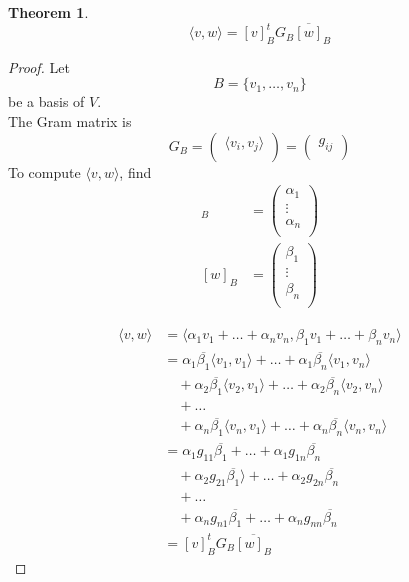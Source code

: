 \documentclass[fleqn, a4paper, 12pt]{article}
\theoremstyle{definition}
\theoremstyle{theorem}
\newtheorem{theorem}{Theorem} %
\theoremstyle{remark}
\numberwithin{corollary}{theorem}
\numberwithin{equation}{theorem}
\begin{document}
\begin{theorem}
	\begin{equation*}
		\langle v, w \rangle = [v]_B^t G_B \overline{[w]}_B
	\end{equation*}
\end{theorem}

\begin{proof}
	Let
	\begin{equation*}
		B = \{v_1, \dots, v_n\}
	\end{equation*}
	be a basis of $V$.\\
	The Gram matrix is
	\begin{equation*}
		G_B = 
			\begin{pmatrix}
				\langle v_i, v_j \rangle\\
			\end{pmatrix}
			=
			\begin{pmatrix}
				g_{ij}\\
			\end{pmatrix}
	\end{equation*}
	To compute $\langle v, w \rangle$, find 
	\begin{align*}
		[v]_B &= 
			\begin{pmatrix}
				\alpha_1\\
				\vdots\\
				\alpha_n\\
			\end{pmatrix}\\
		[w]_B &= 
			\begin{pmatrix}
				\beta_1\\
				\vdots\\
				\beta_n\\
			\end{pmatrix}
	\end{align*}
	
	\begin{align*}
		\langle v, w \rangle &= \langle \alpha_1 v_1 + \dots + \alpha_n v_n, \beta_1 v_1 + \dots + \beta_n v_n \rangle\\
		&= \alpha_1 \overline{\beta_1} \langle v_1, v_1 \rangle + \dots + \alpha_1 \overline{\beta_n} \langle v_1, v_n \rangle\\
			&\quad + \alpha_2 \overline{\beta_1} \langle v_2, v_1 \rangle + \dots + \alpha_2 \overline{\beta_n} \langle v_2, v_n \rangle\\
			&\quad +\dots\\
			&\quad +\alpha_n \overline{\beta_1} \langle v_n, v_1 \rangle + \dots + \alpha_n \overline{\beta_n} \langle v_n, v_n \rangle\\
		&= \alpha_1 g_{11} \overline{\beta_1} + \dots + \alpha_1 g_{1n} \overline{\beta_n}\\
			&\quad + \alpha_2 g_{21} \overline{\beta_1}\rangle + \dots + \alpha_2 g_{2n} \overline{\beta_n}\\
			&\quad +\dots\\
			&\quad +\alpha_n g_{n1} \overline{\beta_1}+ \dots + \alpha_n g_{nn} \overline{\beta_n}\\
		&= [v]_B^t G_B \overline{[w]_B}
	\end{align*}
\end{proof}
\end{document}
